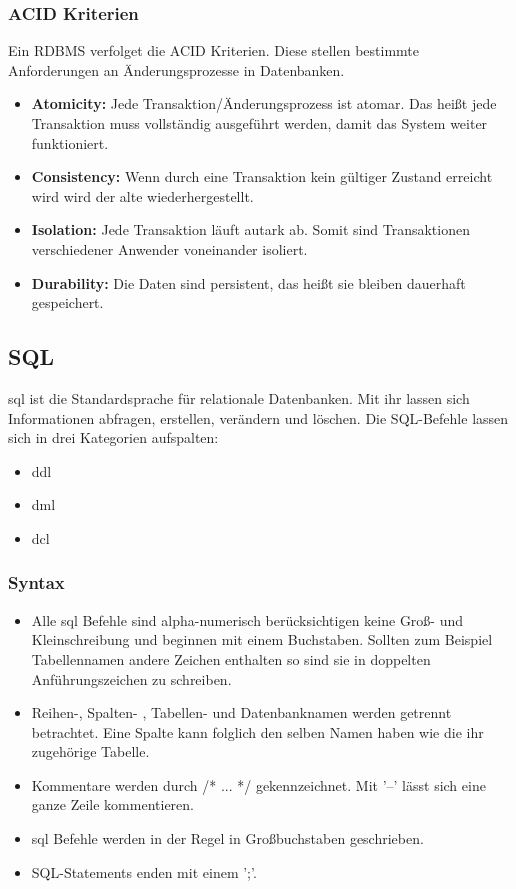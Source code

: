 \documentclass[12pt, a4paper, twoside]{article}
\begin{document}
		\subsubsection{ACID Kriterien}
	Ein \ac{RDBMS} verfolget die ACID Kriterien. Diese stellen bestimmte Anforderungen an Änderungsprozesse in Datenbanken.
	
	\begin{itemize}
		\item \textbf{Atomicity:} Jede Transaktion/Änderungsprozess ist atomar. Das heißt jede Transaktion muss vollständig ausgeführt werden, damit das System weiter funktioniert.
		\item \textbf{Consistency:} Wenn durch eine Transaktion kein gültiger Zustand erreicht wird wird der alte wiederhergestellt. 
		\item \textbf{Isolation:} Jede Transaktion läuft autark ab. Somit sind Transaktionen verschiedener Anwender voneinander isoliert.
		\item \textbf{Durability:} Die Daten sind persistent, das heißt sie bleiben dauerhaft gespeichert.
	\end{itemize}
	\cite{acid-bigdata} \cite{ali2019comparison}
	
	
	\subsection{SQL}
		\ac{sql} ist die Standardsprache für relationale Datenbanken. Mit ihr lassen  sich Informationen abfragen, erstellen, verändern und löschen. Die SQL-Befehle lassen sich in drei Kategorien aufspalten:
		\begin{itemize}
			\item  \ac{ddl}
			\item \ac{dml}
			\item \ac{dcl}
		\end{itemize}
	
		\subsubsection{Syntax}
		\begin{itemize}
			\item  Alle \ac{sql} Befehle sind alpha-numerisch berücksichtigen keine Groß- und Kleinschreibung und beginnen mit einem Buchstaben. Sollten zum Beispiel Tabellennamen andere Zeichen enthalten so sind sie in doppelten Anführungszeichen zu schreiben.
			\item Reihen-, Spalten- , Tabellen-  und Datenbanknamen werden getrennt betrachtet. Eine Spalte kann folglich den selben Namen haben wie die ihr zugehörige Tabelle.
			\item Kommentare werden durch /* ... */ gekennzeichnet. Mit '--' lässt sich eine ganze Zeile kommentieren.
			\item \ac{sql} Befehle werden in der Regel in Großbuchstaben geschrieben.
			\item SQL-Statements enden mit einem ';'.
		\end{itemize}
	
\end{document}
